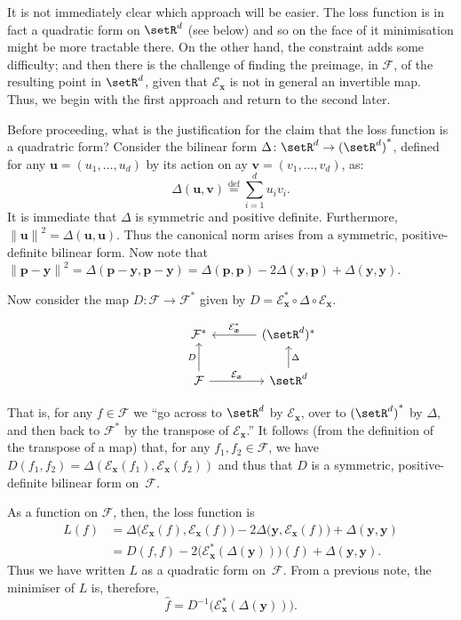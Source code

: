 \documentclass[10pt, a4paper]{article}
\newcommand{\isdef}{\stackrel{\text{def}}{=}}
\newcommand{\evalmap}{\mathcal{E}_{\bm{x}}}
\begin{document}
It is not immediately clear which approach will be easier. The loss
function is in fact a quadratic form on $\setR^d$ (see below) and so
on the face of it minimisation might be more tractable there. On the
other hand, the constraint adds some difficulty; and then there is the
challenge of finding the preimage, in $\mathcal{F}$, of the resulting point in
$\setR^d$, given that $\evalmap$ is not in general an invertible
map. Thus, we begin with the first approach and return to the second
later.

Before proceeding, what is the justification for the claim that the
loss function is a quadratric form? Consider the bilinear form
$\Delta\colon \setR^d\to{(\setR^d)}^*$, defined for any
$\bm{u}=(u_1, \dotsc, u_d)$ by its action on ay
$\bm{v}=(v_1,\dotsc, v_d)$, as:
\[
  \Delta(\bm{u}, \bm{v}) \isdef \sum_{i=1}^d u_i v_i.
\]
It is immediate that $\Delta$ is symmetric and positive
definite. Furthermore,
${\lVert \bm{u} \rVert}^2 = \Delta(\bm{u}, \bm{u})$. Thus the canonical
norm arises from a symmetric, positive-definite bilinear form. Now
note that
${\lVert \bm{p}-\bm{y}\rVert}^2 = \Delta(\bm{p}-\bm{y}, \bm{p}-\bm{y}) =
\Delta(\bm{p}, \bm{p})-2 \Delta(\bm{y}, \bm{p}) + \Delta(\bm{y}, \bm{y})$.

Now consider the map $D:\mathcal{F}\to\mathcal{F}^*$ given by
$D = \evalmap^* \circ \Delta \circ \evalmap$.
\begin{marginfigure}
  \[\begin{tikzcd}[column sep=large]
      & \mathcal{F}^*  & (\setR^d)^* \arrow[l, "\evalmap^*"'] \\
      & \mathcal{F} \arrow[u, "D"] \arrow[r, "\evalmap"] & \setR^d \arrow[u,
      "\Delta"'] 
      \end{tikzcd}\]
\end{marginfigure}  
That is, for any
$f\in\mathcal{F}$ we “go across to $\setR^d$ by $\evalmap$, over to
${(\setR^d)}^*$ by $\Delta$, and then back to $\mathcal{F}^*$ by the transpose of
$\evalmap$.” It follows (from the definition of the transpose of a map)
that, for any $f_1,f_2\in\mathcal{F}$, we have
$D(f_1,f_2) = \Delta(\evalmap(f_1), \evalmap(f_2))$ and thus that $D$ is a
symmetric, positive-definite bilinear form on~$\mathcal{F}$.

As a function on $\mathcal{F}$, then, the loss function is
\[
  \begin{aligned}
    L(f)
    & =  \Delta\bigl(\evalmap(f), \evalmap(f)\bigr)-2 \Delta\bigl(\bm{y}, \evalmap(f)\bigr) +
      \Delta(\bm{y}, \bm{y}) \\
    & = D(f, f) - 2 \bigl(\evalmap^*(\Delta(\bm{y}))\bigr)(f) + \Delta(\bm{y}, \bm{y}).
  \end{aligned}
\]
Thus we have written $L$ as a quadratic form on~$\mathcal{F}$. From a previous
note, the minimiser of $L$ is, therefore,
\[
\hat{f} = D^{-1}\bigl(\evalmap^*(\Delta(\bm{y}))\bigr).
\]
\end{document}
